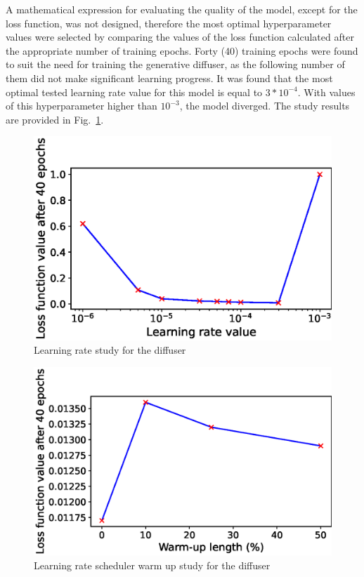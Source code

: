 \documentclass[runningheads]{llncs}
\begin{document}
A mathematical expression for evaluating the quality of the model, except for the loss function, was not designed, therefore the most optimal hyperparameter values were selected by comparing the values of the loss function calculated after the appropriate number of training epochs. Forty (40) training epochs were found to suit the need for training the generative diffuser, as the following number of them did not make significant learning progress. It was found that the most optimal tested learning rate value for this model is equal to $3 * 10^{-4}$. With values of this hyperparameter higher than $10^{-3}$, the model diverged. The study results are provided in Fig.~\ref{img:learning_rate_results}.
\\
\begin{minipage}{0.47\textwidth}
    \begin{figure}[H]
        \centering
        \includegraphics[scale=0.36]{img/learning_rate.eps}
        \caption{Learning rate study for the diffuser}
        \label{img:learning_rate_results}
    \end{figure}
\end{minipage}
\hfill
\begin{minipage}{0.47\textwidth}
    \begin{figure}[H]
        \centering
        \includegraphics[scale=0.36]{img/warm_up.eps}
        \caption{Learning rate scheduler warm up study for the diffuser}
        \label{img:cosine_warmup_results}
    \end{figure}
\end{minipage}
\end{document}
